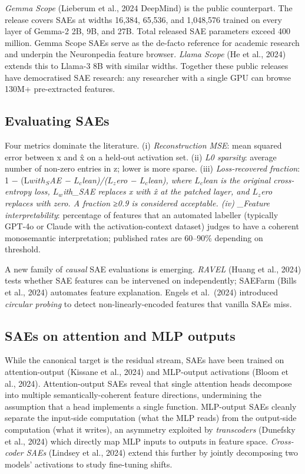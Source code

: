 \emph{Gemma Scope} (Lieberum et al., 2024 DeepMind) is the public counterpart. The release covers SAEs at widths 16,384, 65,536, and 1,048,576 trained on every layer of Gemma-2 2B, 9B, and 27B. Total released SAE parameters exceed 400 million. Gemma Scope SAEs serve as the de-facto reference for academic research and underpin the Neuronpedia feature browser. \emph{Llama Scope} (He et al., 2024) extends this to Llama-3 8B with similar widths. Together these public releases have democratised SAE research: any researcher with a single GPU can browse 130M+ pre-extracted features.

\subsection{Evaluating SAEs}\label{evaluating-saes}

Four metrics dominate the literature. (i) \emph{Reconstruction MSE}: mean squared error between x and x̂ on a held-out activation set. (ii) \emph{L0 sparsity}: average number of non-zero entries in z; lower is more sparse. (iii) \emph{Loss-recovered fraction}: 1 − (L\emph{\(with_S\)AE − \(L_c\)lean)/(\(L_z\)ero − \(L_c\)lean), where \(L_c\)lean is the original cross-entropy loss, \(L_w\)ith\_SAE replaces x with x̂ at the patched layer, and \(L_z\)ero replaces with zero. A fraction ≥0.9 is considered acceptable. (iv) \_Feature interpretability}: percentage of features that an automated labeller (typically GPT-4o or Claude with the activation-context dataset) judges to have a coherent monosemantic interpretation; published rates are 60--90\% depending on threshold.

A new family of \emph{causal} SAE evaluations is emerging. \emph{RAVEL} (Huang et al., 2024) tests whether SAE features can be intervened on independently; SAEFarm (Bills et al., 2024) automates feature explanation. Engels et al.~(2024) introduced \emph{circular probing} to detect non-linearly-encoded features that vanilla SAEs miss.

\subsection{SAEs on attention and MLP outputs}\label{saes-on-attention-and-mlp-outputs}

While the canonical target is the residual stream, SAEs have been trained on attention-output (Kissane et al., 2024) and MLP-output activations (Bloom et al., 2024). Attention-output SAEs reveal that single attention heads decompose into multiple semantically-coherent feature directions, undermining the assumption that a head implements a single function. MLP-output SAEs cleanly separate the input-side computation (what the MLP reads) from the output-side computation (what it writes), an asymmetry exploited by \emph{transcoders} (Dunefsky et al., 2024) which directly map MLP inputs to outputs in feature space. \emph{Cross-coder SAEs} (Lindsey et al., 2024) extend this further by jointly decomposing two models' activations to study fine-tuning shifts.

